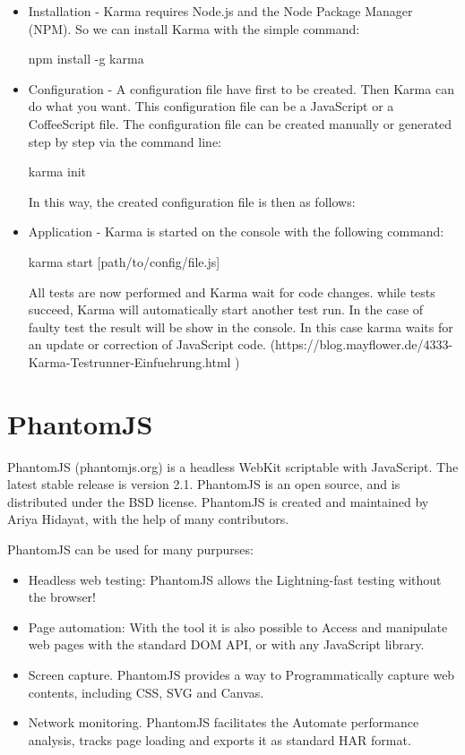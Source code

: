 \documentclass[11pt]{article}
\begin{document}
\begin{itemize}
\item Installation - Karma requires Node.js and the Node Package Manager (NPM). So we can install Karma with the simple command:

\textdollar{} npm install -g karma
\item Configuration - A configuration file have first to be created. Then Karma can do what you want. This configuration file can be a JavaScript or a CoffeeScript file. The configuration file can be created manually or generated step by step via the command line:

\textdollar{} karma init

In this way, the created configuration file is then as follows:
\item Application - Karma is started on the console with the following command:

\textdollar{} karma start [path/to/config/file.js]

All tests are now performed and Karma wait for code changes. while tests succeed, Karma will automatically start another test run. In the case of faulty test the result will be show in the console. In this case karma waits for an update or correction of JavaScript code. (https://blog.mayflower.de/4333-Karma-Testrunner-Einfuehrung.html )
\end{itemize}

\section{PhantomJS}

PhantomJS (phantomjs.org) is a headless WebKit scriptable with JavaScript. The latest stable release is version 2.1. PhantomJS is an open source, and is distributed under the BSD license. PhantomJS is created and maintained by Ariya Hidayat, with the help of many contributors.

PhantomJS can be used for many purpurses:

\begin{itemize}
\item Headless web testing: PhantomJS allows the Lightning-fast testing without the browser!
\item Page automation: With the tool it is also possible to Access and manipulate web pages with the standard DOM API, or with any JavaScript library.
\item Screen capture. PhantomJS provides a way to Programmatically capture web contents, including CSS, SVG and Canvas.
\item Network monitoring. PhantomJS facilitates the Automate performance analysis, tracks page loading and exports it as standard HAR format.
\end{itemize}
\end{document}
